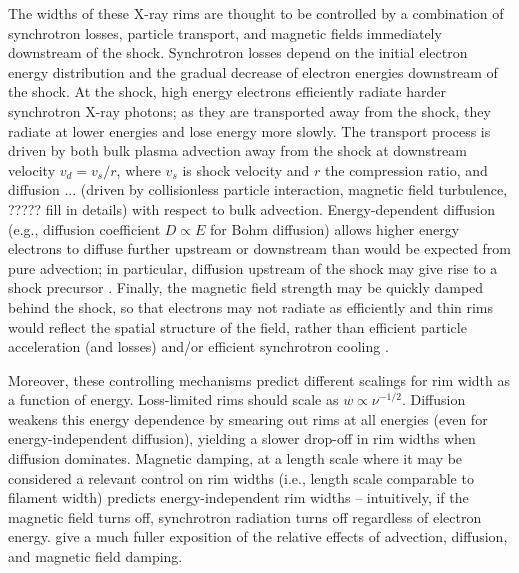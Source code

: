 \documentclass[iop, apj, numberedappendix, twocolappendix]{emulateapj}
\begin{document}
The widths of these X-ray rims are thought to be controlled by a combination of
synchrotron losses, particle transport, and magnetic fields immediately
downstream of the shock.  Synchrotron losses depend on the initial electron
energy distribution and the gradual decrease of electron energies downstream of
the shock.  At the shock, high energy electrons efficiently radiate harder
synchrotron X-ray photons; as they are transported away from the shock, they
radiate at lower energies and lose energy more slowly.  The transport process
is driven by both bulk plasma advection away from the shock at downstream
velocity $v_d = v_s / r$, where $v_s$ is shock velocity and $r$ the compression
ratio, and diffusion ... (driven by collisionless particle interaction,
magnetic field turbulence, ????? fill in details) with respect to bulk
advection.  Energy-dependent diffusion (e.g., diffusion coefficient $D \propto
E$ for Bohm diffusion) allows higher energy electrons to diffuse further
upstream or downstream than would be expected from pure advection; in
particular, diffusion upstream of the shock may give rise to a shock precursor
\citep[e.g.,][]{ghavamian2000, wagner2009, laming2014}.  Finally, the magnetic
field strength may be quickly damped behind the shock, so that electrons may
not radiate as efficiently and thin rims would reflect the spatial structure of
the field, rather than efficient particle acceleration (and losses) and/or
efficient synchrotron cooling \citep{pohl2005}.  

Moreover, these controlling mechanisms predict different scalings for rim width
as a function of energy.  Loss-limited rims should scale as $w \propto
\nu^{-1/2}$.  Diffusion weakens this energy dependence by smearing out rims at
all energies (even for energy-independent diffusion), yielding a slower
drop-off in rim widths when diffusion dominates.  Magnetic damping, at a
length scale where it may be considered a relevant control on rim widths (i.e.,
length scale comparable to filament width) predicts energy-independent rim
widths -- intuitively, if the magnetic field turns off, synchrotron radiation
turns off regardless of electron energy.  \citet{ressler2014} give a much
fuller exposition of the relative effects of advection, diffusion, and magnetic
field damping.
\end{document}
